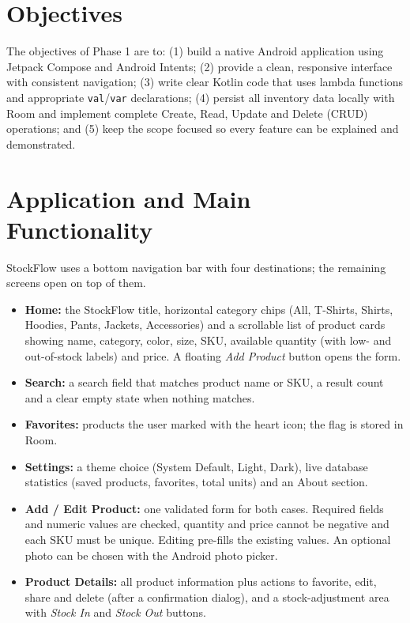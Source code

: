 \documentclass[sigconf,nonacm]{acmart}
\begin{document}
\section{Objectives}
The objectives of Phase 1 are to:
(1) build a native Android application using Jetpack Compose and Android Intents;
(2) provide a clean, responsive interface with consistent navigation;
(3) write clear Kotlin code that uses lambda functions and appropriate
\texttt{val}/\texttt{var} declarations;
(4) persist all inventory data locally with Room and implement complete Create,
Read, Update and Delete (CRUD) operations; and
(5) keep the scope focused so every feature can be explained and demonstrated.

\section{Application and Main Functionality}
StockFlow uses a bottom navigation bar with four destinations; the remaining
screens open on top of them.
\begin{itemize}
  \item \textbf{Home:} the StockFlow title, horizontal category chips
  (All, T-Shirts, Shirts, Hoodies, Pants, Jackets, Accessories) and a scrollable
  list of product cards showing name, category, color, size, SKU, available
  quantity (with low- and out-of-stock labels) and price. A floating
  \emph{Add Product} button opens the form.
  \item \textbf{Search:} a search field that matches product name or SKU, a result
  count and a clear empty state when nothing matches.
  \item \textbf{Favorites:} products the user marked with the heart icon; the flag is
  stored in Room.
  \item \textbf{Settings:} a theme choice (System Default, Light, Dark), live database
  statistics (saved products, favorites, total units) and an About section.
  \item \textbf{Add / Edit Product:} one validated form for both cases. Required
  fields and numeric values are checked, quantity and price cannot be negative and
  each SKU must be unique. Editing pre-fills the existing values. An optional photo
  can be chosen with the Android photo picker.
  \item \textbf{Product Details:} all product information plus actions to favorite,
  edit, share and delete (after a confirmation dialog), and a stock-adjustment area
  with \emph{Stock In} and \emph{Stock Out} buttons.
\end{itemize}
\end{document}
